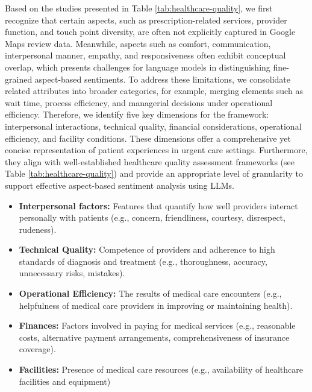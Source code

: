 \documentclass[journal,twoside,web]{ieeecolor}
\begin{document}
Based on the studies presented in Table \ref{tab:healthcare-quality}, we first recognize that certain aspects, such as prescription-related services, provider function, and touch point diversity, are often not explicitly captured in Google Maps review data. Meanwhile, aspects such as comfort, communication, interpersonal manner, empathy, and responsiveness often exhibit conceptual overlap, which presents challenges for language models in distinguishing fine-grained aspect-based sentiments. To address these limitations, we consolidate related attributes into broader categories, for example, merging elements such as wait time, process efficiency, and managerial decisions under operational efficiency. Therefore, we identify five key dimensions for the framework: interpersonal interactions, technical quality, financial considerations, operational efficiency, and facility conditions. These dimensions offer a comprehensive yet concise representation of patient experiences in urgent care settings. Furthermore, they align with well-established healthcare quality assessment frameworks (see Table \ref{tab:healthcare-quality}) and provide an appropriate level of granularity to support effective aspect-based sentiment analysis using LLMs.

\begin{itemize}
\item \textbf{Interpersonal factors:} Features that quantify how well providers interact personally with patients (e.g., concern, friendliness, courtesy, disrespect, rudeness).
\item \textbf{Technical Quality:} Competence of providers and adherence to high standards of diagnosis and treatment (e.g., thoroughness, accuracy, unnecessary risks, mistakes).
\item \textbf{Operational Efficiency:} The results of medical care encounters (e.g., helpfulness of medical care providers in improving or maintaining health).
\item \textbf{Finances:} Factors involved in paying for medical services (e.g., reasonable costs, alternative payment arrangements, comprehensiveness of insurance coverage).
\item \textbf{Facilities:} Presence of medical care resources (e.g., availability of healthcare facilities and equipment)
\end{itemize}
\end{document}
